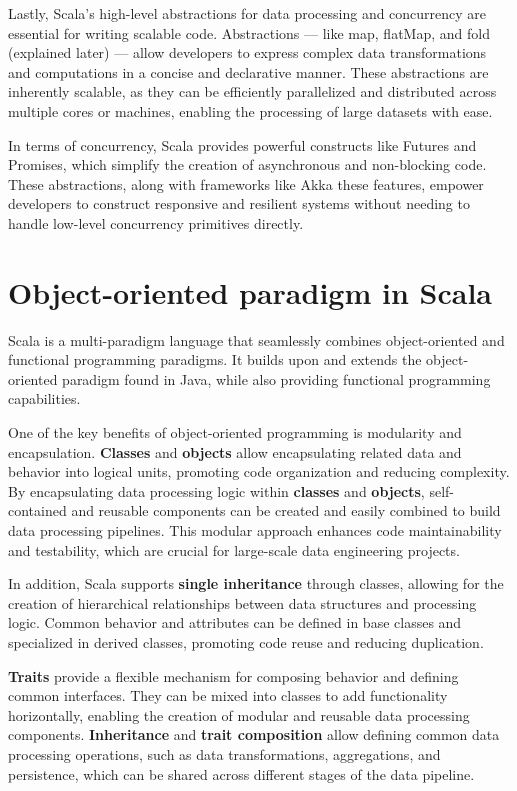 Lastly, Scala's high-level abstractions for data processing and concurrency are essential for writing scalable code. Abstractions — like map, flatMap, and fold (explained later) — allow developers to express complex data transformations and computations in a concise and declarative manner. These abstractions are inherently scalable, as they can be efficiently parallelized and distributed across multiple cores or machines, enabling the processing of large datasets with ease.\footnotemark[1]

In terms of concurrency, Scala provides powerful constructs like Futures and Promises, which simplify the creation of asynchronous and non-blocking code. These abstractions, along with frameworks like Akka these features, empower developers to construct responsive and resilient systems without needing to handle low-level concurrency primitives directly.\footnotemark[1]

\section{Object-oriented paradigm in Scala}
Scala is a multi-paradigm language that seamlessly combines object-oriented and functional programming paradigms. It builds upon and extends the object-oriented paradigm found in Java, while also providing functional programming capabilities.\footnotemark {}

One of the key benefits of object-oriented programming is modularity and encapsulation. \textbf{Classes} and \textbf{objects} allow encapsulating related data and behavior into logical units, promoting code organization and reducing complexity. By encapsulating data processing logic within \textbf{classes} and \textbf{objects}, self-contained and reusable components can be created and easily combined to build data processing pipelines. This modular approach enhances code maintainability and testability, which are crucial for large-scale data engineering projects.\footnotemark[3]

In addition, Scala supports \textbf{single inheritance} through classes, allowing for the creation of hierarchical relationships between data structures and processing logic. Common behavior and attributes can be defined in base classes and specialized in derived classes, promoting code reuse and reducing duplication.\footnotemark[3]

\textbf{Traits} provide a flexible mechanism for composing behavior and defining common interfaces. They can be mixed into classes to add functionality horizontally, enabling the creation of modular and reusable data processing components. \textbf{Inheritance} and \textbf{trait composition} allow defining common data processing operations, such as data transformations, aggregations, and persistence, which can be shared across different stages of the data pipeline.\footnotemark[3]

